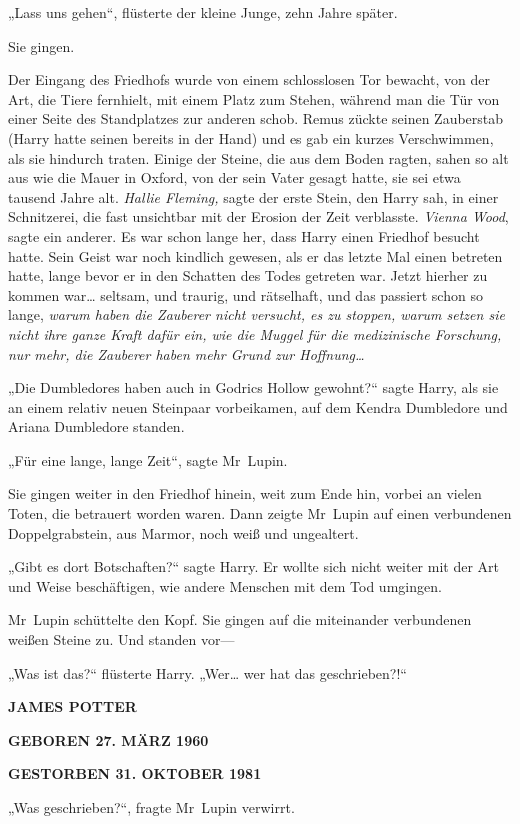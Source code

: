 {„Lass uns gehen“, flüsterte der kleine Junge, zehn Jahre später.

Sie gingen.

Der Eingang des Friedhofs wurde von einem schlosslosen Tor bewacht, von der Art, die Tiere fernhielt, mit einem Platz zum Stehen, während man die Tür von einer Seite des Standplatzes zur anderen schob. Remus zückte seinen Zauberstab (Harry hatte seinen bereits in der Hand) und es gab ein kurzes Verschwimmen, als sie hindurch traten. Einige der Steine, die aus dem Boden ragten, sahen so alt aus wie die Mauer in Oxford, von der sein Vater gesagt hatte, sie sei etwa tausend Jahre alt. \emph{Hallie Fleming,} sagte der erste Stein, den Harry sah, in einer Schnitzerei, die fast unsichtbar mit der Erosion der Zeit verblasste. \emph{Vienna Wood}, sagte ein anderer. Es war schon lange her, dass Harry einen Friedhof besucht hatte. Sein Geist war noch kindlich gewesen, als er das letzte Mal einen betreten hatte, lange bevor er in den Schatten des Todes getreten war. Jetzt hierher zu kommen war… seltsam, und traurig, und rätselhaft, und das passiert schon so lange, \emph{warum haben die Zauberer nicht versucht, es zu stoppen, warum setzen sie nicht ihre ganze Kraft dafür ein, wie die Muggel für die medizinische Forschung, nur mehr, die Zauberer haben mehr Grund zur Hoffnung…}

„Die Dumbledores haben auch in Godrics Hollow gewohnt?“ sagte Harry, als sie an einem relativ neuen Steinpaar vorbeikamen, auf dem Kendra Dumbledore und Ariana Dumbledore standen.

„Für eine lange, lange Zeit“, sagte Mr~Lupin.

Sie gingen weiter in den Friedhof hinein, weit zum Ende hin, vorbei an vielen Toten, die betrauert worden waren. Dann zeigte Mr~Lupin auf einen verbundenen Doppelgrabstein, aus Marmor, noch weiß und ungealtert.

„Gibt es dort Botschaften?“ sagte Harry. Er wollte sich nicht weiter mit der Art und Weise beschäftigen, wie andere Menschen mit dem Tod umgingen.

Mr~Lupin schüttelte den Kopf. Sie gingen auf die miteinander verbundenen weißen Steine zu. Und standen vor—

„Was ist das?“ flüsterte Harry. „Wer… wer hat das geschrieben?!“

\textbf{JAMES POTTER}

\textbf{GEBOREN 27. MÄRZ 1960}

\textbf{GESTORBEN 31. OKTOBER 1981}

„Was geschrieben?“, fragte Mr~Lupin verwirrt.

}
